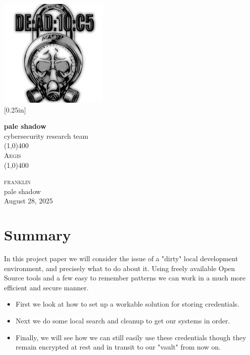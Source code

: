 \documentclass[11pt]{report}
\newcommand{\myTitle}{Aegis}
\newcommand{\myName}{franklin}
\newcommand{\myOrg}{pale shadow}
\newcommand{\myDate}{August 28, 2025}
\begin{document}
	\begin{titlepage}
		\begin{center}
			\includegraphics[scale=0.75]{../static/images/new_logo.jpeg}\\
			[0.25in]

			\textbf{\Large{\myOrg}}\\
			\Large{cybersecurity research team}\\
			[1in]

			\line(1,0){400}\\
			[2mm]
			\textsc{\Large{\myTitle}} \\
			\line(1,0){400} \\
			[1in]
		\end{center}
		\begin{center}
			\textsc{\Large \myName}	\\
			\myOrg\\
			[1in]
			\myDate
		\end{center}
	\end{titlepage}

	\section*{Summary}
    In this project paper we will consider the issue of a "dirty" local development
    environment, and precisely what to do about it. Using freely available
    Open Source tools and a few easy to remember patterns we can work in a
    much more efficient and secure manner.

    \begin{itemize}
    	\item First we look at how to set up a workable solution for storing credentials.
		\item Next we do some local search and cleanup to get our systems in order.
		\item Finally, we will see how we can still easily use these credentials though
			they remain encrypted at rest and in transit to our "vault" from now on.
    \end{itemize}
\end{document}
